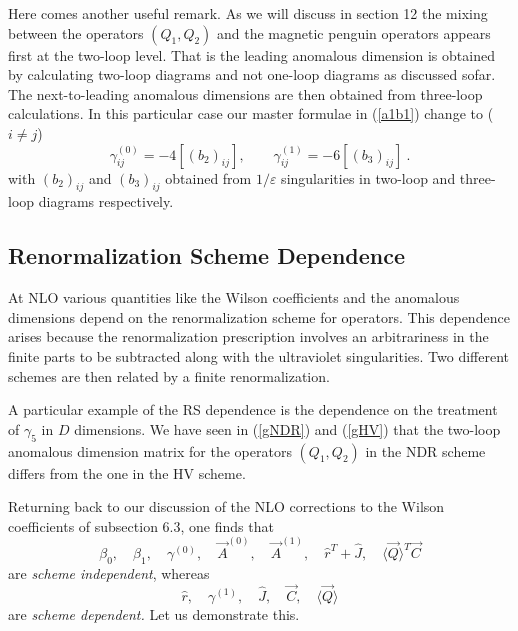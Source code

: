 \documentclass[12pt,rotate]{article}
\def\gf{\gamma_5}
\begin{document}
\begin{itemize}
\begin{itemize}
\begin{itemize}
Here comes another useful remark. As we will discuss in section 12
the mixing between the operators $(Q_1,Q_2)$ and the magnetic
penguin operators appears first at the two-loop level. That is
the leading anomalous dimension is obtained by calculating two-loop
diagrams and not one-loop diagrams as discussed sofar.
The next-to-leading anomalous dimensions are then obtained from
three-loop calculations. In this particular case our master
formulae in (\ref{a1b1})  change to ($i\not=j$)
\begin{equation}\label{a1b1m}
\gamma^{(0)}_{ij}=-4[(b_2)_{ij}],
\quad\quad
\gamma^{(1)}_{ij}=-6[(b_3)_{ij}]~.  
\end{equation}
with $(b_2)_{ij}$ and $(b_3)_{ij}$ obtained from $1/\varepsilon$
singularities in two-loop and three-loop diagrams respectively.

\subsection{Renormalization Scheme Dependence}
At NLO various quantities like 
the Wilson coefficients
and the anomalous dimensions depend on the renormalization scheme for
operators.
This dependence  arises because the renormalization
prescription involves an arbitrariness in the finite parts to be
subtracted along with the ultraviolet singularities.  
Two different schemes are then related by a finite renormalization.  

A particular example of the RS  dependence is the dependence on the
treatment of $\gf$ in $D$ dimensions. We have seen in (\ref{gNDR})
and (\ref{gHV}) that the two-loop anomalous dimension matrix for
the operators $(Q_1,Q_2)$ in the NDR scheme differs from the one
in the HV scheme. 

Returning back to our discussion of the NLO corrections to the
Wilson coefficients of subsection 6.3, one finds that 
\begin{equation}\label{rsi}
\beta_0,\quad\beta_1,\quad\gamma^{(0)},\quad\vec A^{(0)},\quad
\vec A^{(1)},\quad \hat r^T+\hat J,\quad\langle\vec Q\rangle^T\vec C  
\end{equation}
are {\it scheme independent}, whereas
 \begin{equation}\label{rsd}
\hat r,\quad\gamma^{(1)},\quad \hat J,\quad\vec C,\quad\langle\vec Q\rangle 
\end{equation}
are {\it scheme dependent.} Let us demonstrate this.


\end{itemize}
\end{itemize}
\end{itemize}
\end{document}
